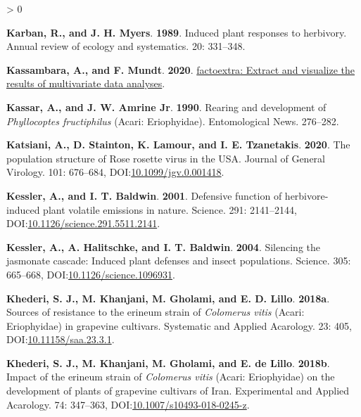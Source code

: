 \documentclass{ufdissertation}[overrideChapters] %
\newlength{\cslhangindent}
\newenvironment{CSLReferences}[2] %
 {%
  \setlength{\parindent}{0pt}
  \ifodd #1 \everypar{\setlength{\hangindent}{\cslhangindent}}\ignorespaces\fi
  \ifnum #2 > 0
  \setlength{\parskip}{#2\baselineskip}
  \fi
 }%
 {}
\begin{document}
{\begin{CSLReferences}{1}{1}
\leavevmode{}%
\textbf{Karban, R., and J. H. Myers}. \textbf{1989}. Induced plant responses to herbivory. Annual review of ecology and systematics. 20: 331--348.

\leavevmode{}%
\textbf{Kassambara, A., and F. Mundt}. \textbf{2020}. \href{https://CRAN.R-project.org/package=factoextra}{{factoextra}: Extract and visualize the results of multivariate data analyses}.

\leavevmode{}%
\textbf{Kassar, A., and J. W. Amrine Jr}. \textbf{1990}. Rearing and development of {\emph{Phyllocoptes fructiphilus}} ({Acari}: {Eriophyidae}). Entomological News. 276--282.

\leavevmode{}%
\textbf{Katsiani, A., D. Stainton, K. Lamour, and I. E. Tzanetakis}. \textbf{2020}. The population structure of {Rose rosette virus} in the {USA}. Journal of General Virology. 101: 676--684, DOI:\href{https://doi.org/10.1099/jgv.0.001418}{10.1099/jgv.0.001418}.

\leavevmode{}%
\textbf{Kessler, A., and I. T. Baldwin}. \textbf{2001}. Defensive function of herbivore-induced plant volatile emissions in nature. Science. 291: 2141--2144, DOI:\href{https://doi.org/10.1126/science.291.5511.2141}{10.1126/science.291.5511.2141}.

\leavevmode{}%
\textbf{Kessler, A., A. Halitschke, and I. T. Baldwin}. \textbf{2004}. Silencing the jasmonate cascade: Induced plant defenses and insect populations. Science. 305: 665--668, DOI:\href{https://doi.org/10.1126/science.1096931}{10.1126/science.1096931}.

\leavevmode{}%
\textbf{Khederi, S. J., M. Khanjani, M. Gholami, and E. D. Lillo}. \textbf{2018a}. Sources of resistance to the erineum strain of {\emph{Colomerus vitis}} ({Acari}: {Eriophyidae}) in grapevine cultivars. Systematic and Applied Acarology. 23: 405, DOI:\href{https://doi.org/10.11158/saa.23.3.1}{10.11158/saa.23.3.1}.

\leavevmode{}%
\textbf{Khederi, S. J., M. Khanjani, M. Gholami, and E. de Lillo}. \textbf{2018b}. Impact of the erineum strain of {\emph{Colomerus vitis}} ({Acari}: {Eriophyidae}) on the development of plants of grapevine cultivars of {Iran}. Experimental and Applied Acarology. 74: 347--363, DOI:\href{https://doi.org/10.1007/s10493-018-0245-z}{10.1007/s10493-018-0245-z}.


\end{CSLReferences}}
\end{document}
